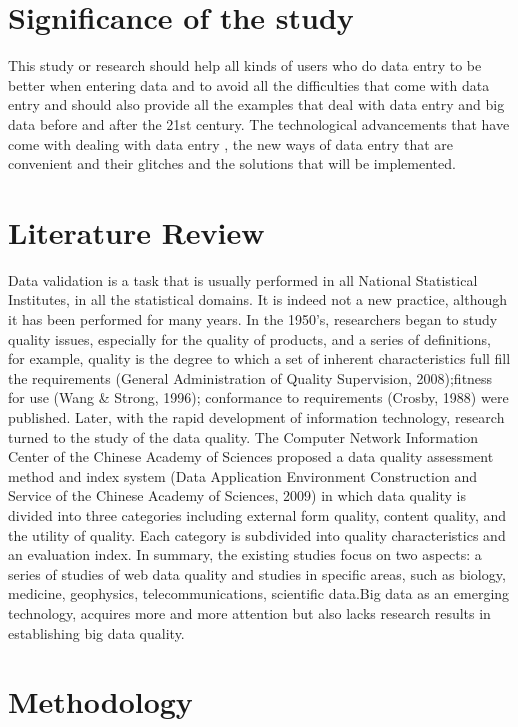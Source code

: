 \documentclass[12pt,]{article}
\begin{document}
\section{Significance of the study}
This study or research should help all kinds of users who do data entry to be better when entering data and to avoid all the difficulties that come with data entry and should also provide all the examples that deal with data entry and big data  before and after the 21st century. The technological advancements that have come with dealing with data entry , the new ways of data entry that are convenient and their glitches and the solutions that will be implemented.
\section{Literature Review}
Data validation is a task that is usually performed in all National Statistical Institutes, in all the statistical domains. It is indeed not a new practice, although it has been performed for many years. In the 1950's, researchers began to study quality issues, especially for the quality of products, and a series of definitions, for example, quality is the degree to which a set of inherent characteristics full fill the requirements (General Administration of Quality Supervision, 2008);fitness for use (Wang & Strong, 1996); conformance to requirements (Crosby, 1988) were published. Later, with the rapid development of information technology, research turned to the study of the data quality. 
The Computer Network Information Center of the Chinese Academy of Sciences proposed a data quality assessment method and index system (Data Application Environment Construction and Service of the Chinese Academy of Sciences, 2009) in which data quality is divided into three categories including external form quality, content quality, and the utility of quality. Each category is subdivided into quality characteristics and an evaluation index. 
In summary, the existing studies focus on two aspects: a series of studies of web data quality and studies in specific areas, such as biology, medicine, geophysics, telecommunications, scientific data.Big data as an emerging technology, acquires more and more attention but also lacks research results in establishing big data quality.

\section{Methodology}
\end{document}
